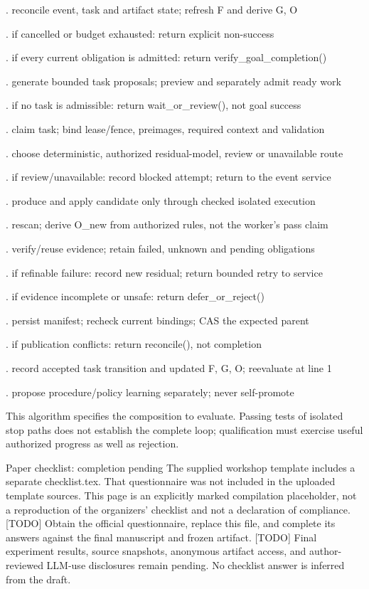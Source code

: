 \documentclass{article}
\begin{document}
. reconcile event, task and artifact state; refresh F and derive G, O\par
{}. if cancelled or budget exhausted: return explicit non-success\par
{}. if every current obligation is admitted: return verify\_goal\_completion()\par
{}. generate bounded task proposals; preview and separately admit ready work\par
{}. if no task is admissible: return wait\_or\_review(), not goal success\par
{}. claim task; bind lease/fence, preimages, required context and validation\par
{}. choose deterministic, authorized residual-model, review or unavailable route\par
{}. if review/unavailable: record blocked attempt; return to the event service\par
{}. produce and apply candidate only through checked isolated execution\par
{}. rescan; derive O\_new from authorized rules, not the worker’s pass claim\par
{}. verify/reuse evidence; retain failed, unknown and pending obligations\par
{}. if refinable failure: record new residual; return bounded retry to service\par
{}. if evidence incomplete or unsafe: return defer\_or\_reject()\par
{}. persist manifest; recheck current bindings; CAS the expected parent\par
{}. if publication conflicts: return reconcile(), not completion\par
{}. record accepted task transition and updated F, G, O; reevaluate at line 1\par
{}. propose procedure/policy learning separately; never self-promote\par

This algorithm specifies the composition to evaluate. Passing tests of isolated stop paths does
not establish the complete loop; qualification must exercise useful authorized progress as well as
rejection.




Paper checklist: completion pending
The supplied workshop template includes a separate checklist.tex. That questionnaire was not
included in the uploaded template sources. This page is an explicitly marked compilation placeholder,
not a reproduction of the organizers’ checklist and not a declaration of compliance.
[TODO] Obtain the official questionnaire, replace this file, and complete its answers against the final
manuscript and frozen artifact.
[TODO] Final experiment results, source snapshots, anonymous artifact access, and author-reviewed
LLM-use disclosures remain pending. No checklist answer is inferred from the draft.
\end{document}
